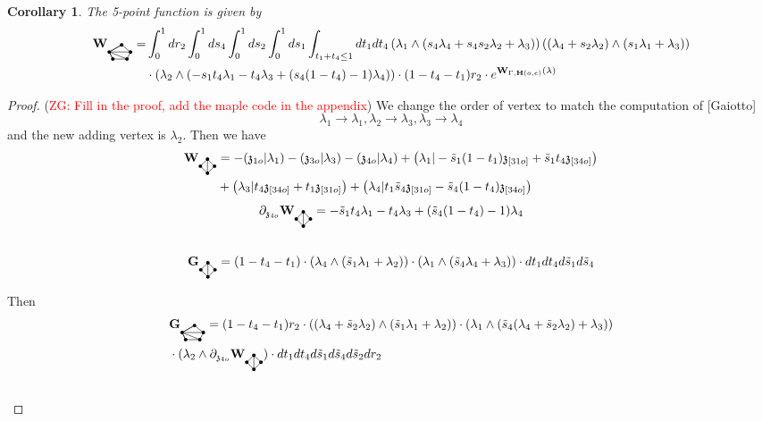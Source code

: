 \documentclass[11pt]{amsart}
\newcommand{\bgraphG}{
  \mathbf{G}_{\tikz[baseline=-0.5ex]{
      \coordinate (A) at (0,0);
      \coordinate (B) at (4mm,0);
      \coordinate (C) at (5mm,2mm);
      \coordinate (D) at (2.5mm,4mm);
      \coordinate (E) at (-1mm,2mm);

      \fill (A) circle (0.5mm);
      \fill (B) circle (0.5mm);
      \fill (C) circle (0.5mm);
      \fill (D) circle (0.5mm);
      \fill (E) circle (0.5mm);

      \draw (A) -- (B);
      \draw (B) -- (C);
      \draw (C) -- (D);
      \draw (D) -- (E);
      \draw (E) -- (A);

      \draw (E) -- (A);
      \draw (E) -- (B);
      \draw (E) -- (C);
      \draw (E) -- (D);
  }}
}
\newcommand{\bgraphW}{
  \mathbf{W}_{\tikz[baseline=-0.5ex]{
      \coordinate (A) at (0,0);
      \coordinate (B) at (4mm,0);
      \coordinate (C) at (5mm,2mm);
      \coordinate (D) at (2.5mm,4mm);
      \coordinate (E) at (-1mm,2mm);

      \fill (A) circle (0.5mm);
      \fill (B) circle (0.5mm);
      \fill (C) circle (0.5mm);
      \fill (D) circle (0.5mm);
      \fill (E) circle (0.5mm);

      \draw (A) -- (B);
      \draw (B) -- (C);
      \draw (C) -- (D);
      \draw (D) -- (E);
      \draw (E) -- (A);

      \draw (E) -- (A);
      \draw (E) -- (B);
      \draw (E) -- (C);
      \draw (E) -- (D);
  }}
}
\newcommand{\agraphG}{
  \mathbf{G}_{\tikz[baseline=-0.5ex]{
      \coordinate (A) at (0,0);
      \coordinate (B) at (4mm,0);
      \coordinate (C) at (2mm,2mm);
      \coordinate (D) at (2mm,-2mm);

      \fill (A) circle (0.5mm);
      \fill (B) circle (0.5mm);
      \fill (C) circle (0.5mm);
      \fill (D) circle (0.5mm);

      \draw (A) -- (C);
      \draw (A) -- (D);
      \draw (C) -- (D);
      \draw (B) -- (C);
      \draw (B) -- (D);
  }}
}
\newcommand{\agraphW}{
  \mathbf{W}_{\tikz[baseline=-0.5ex]{
      \coordinate (A) at (0,0);
      \coordinate (B) at (4mm,0);
      \coordinate (C) at (2mm,2mm);
      \coordinate (D) at (2mm,-2mm);

      \fill (A) circle (0.5mm);
      \fill (B) circle (0.5mm);
      \fill (C) circle (0.5mm);
      \fill (D) circle (0.5mm);

      \draw (A) -- (C);
      \draw (A) -- (D);
      \draw (C) -- (D);
      \draw (B) -- (C);
      \draw (B) -- (D);
  }}
}
\newtheorem{cor}[thm]{Corollary}
\theoremstyle{definition}
\theoremstyle{remark}
\numberwithin{equation}{section}
\newcommand{\Gui}[1]{(\textcolor{red}{ZG: #1})}
\begin{document}
\fi
\begin{cor}
The 5-point function is given by
\begin{align*}
   \bgraphW=& \int^1_0dr_2\int^1_0ds_4\int^1_0ds_2\int^1_0ds_1\int_{t_1+t_4\leq 1}dt_1dt_4\left(\lambda_1\wedge (s_4\lambda_4+s_4s_2\lambda_2+\lambda_3) \right)\left( (\lambda_4+s_2\lambda_2)\wedge (s_1\lambda_1+\lambda_3)\right)  \\
   & \cdot \left(\lambda_2\wedge (-s_1t_4\lambda_1-t_4\lambda_3+(s_4(1-t_4)-1)\lambda_4)\right)\cdot(1-t_4-t_1) r_2\cdot e^{\mathbf{W}_{\Gamma,\mathbf{H}(o,e)}(\lambda)}
\end{align*}

\end{cor}
\begin{proof}
  \Gui{Fill in the proof, add the maple code in the appendix}
  We change the order of vertex to match the computation of [Gaiotto]
  $$
  \lambda_1\rightarrow\lambda_1,\lambda_2\rightarrow \lambda_3, \lambda_3\rightarrow \lambda_4
  $$
  and the new adding vertex is $\lambda_2$. Then we have
  \begin{align*}
      \agraphW &=-(\mathfrak{z}_{1o}|\lambda_1)-(\mathfrak{z}_{3o}|\lambda_3)-\left(\mathfrak{z}_{4o}|\lambda_{4}\right)+\left(\lambda_1|-\tilde{s}_1(1-t_1)\mathfrak{z}_{[3 1o]}+\tilde{s}_1t_4\mathfrak{z}_{[34o]}\right)\\
&+\left(\lambda_3|t_4\mathfrak{z}_{[34o]}+t_1\mathfrak{z}_{[3 1o]}\right)+\left(\lambda_4|t_1\tilde{s}_4\mathfrak{z}_{[31o]}-\tilde{s}_4(1-t_4)\mathfrak{z}_{[34o]}\right)\\
\end{align*}
$$
\partial_{\mathfrak{z}_{4o}}\agraphW=-\tilde{s}_1t_4\lambda_1-t_4\lambda_3+(\tilde{s}_4(1-t_4)-1)\lambda
_4
$$
  \begin{align*}
     &  \\
     \agraphG& =(1-t_4-t_1)\cdot(\lambda_4\wedge(\tilde{s}_1\lambda_1+\lambda_2))\cdot (\lambda_1\wedge(\tilde{s}_4\lambda_4+\lambda_3)) \cdot dt_1dt_4d\tilde{s}_1d\tilde{s}_4
  \end{align*}
  
  Then
  \begin{align*}
 &\bgraphG =  (1-t_4-t_1)r_2\cdot((\lambda_4+\tilde{s}_2\lambda_2)\wedge(\tilde{s}_1\lambda_1+\lambda_2))\cdot (\lambda_1\wedge(\tilde{s}_4(\lambda_4+\tilde{s}_2\lambda_2)+\lambda_3)) \\ &\cdot  (\lambda_2\wedge \partial_{\mathfrak{z}_{4o}}\agraphW)\cdot dt_1dt_4d\tilde{s}_1d\tilde{s}_4d\tilde{s}_2dr_2 \\
     & 
  \end{align*}
\end{proof}
\end{document}
